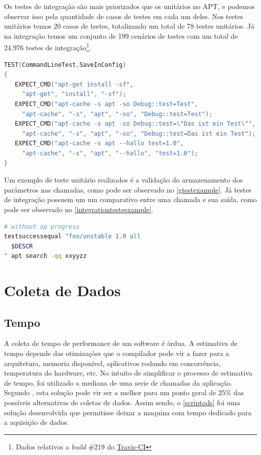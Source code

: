 Os testes de integração são mais priorizados que os unitários no APT, e podemos observar isso pela quantidade de casos de testes em cada um deles. Nos testes unitários temos 20 casos de testes, totalizando um total de 78 testes unitários. Já na integração temos um conjunto de 199 cenários de testes com um total de 24.976 testes de integração\footnote{Dados relativos a \textit{build} \#219 do \href{https://travis-ci.org/Debian/apt/builds/}{Travis-CI}}.


\begin{lstlisting}[language=C++,label=gtestexample,caption={Teste de validação de armazenamento de parâmetros}]
TEST(CommandLineTest,SaveInConfig)
{
   EXPECT_CMD("apt-get install -sf",
	 "apt-get", "install", "-sf");
   EXPECT_CMD("apt-cache -s apt -so Debug::test=Test",
	 "apt-cache", "-s", "apt", "-so", "Debug::test=Test");
   EXPECT_CMD("apt-cache -s apt -so Debug::test=\"Das ist ein Test\"",
	 "apt-cache", "-s", "apt", "-so", "Debug::test=Das ist ein Test");
   EXPECT_CMD("apt-cache -s apt --hallo test=1.0",
	 "apt-cache", "-s", "apt", "--hallo", "test=1.0");
}
\end{lstlisting}

Um exemplo de teste unitário realizados é a validação do armazenamento dos parâmetros nas chamadas, como pode ser observado no \autoref{gtestexample}. Já testes de integração possuem um um comparativo entre uma chamada e sua saída, como pode ser observado no \autoref{integrationtesteexample}.

\begin{lstlisting}[language=Bash,label=integrationtesteexample,caption={Teste de verificação de saída para busca}]
# without op progress
testsuccessequal "foo/unstable 1.0 all
  $DESCR
" apt search -qq xxyyzz
\end{lstlisting}



\section{Coleta de Dados} %
\label{cha:coleta_de_dados}

\subsection*{Tempo} %
\label{sec:tempo}

A coleta de tempo de performance de um software é árdua. A estimativa de tempo depende das otimizações que o compilador pode vir a fazer para a arquitetura, memoria disponível, aplicativos rodando em concorrência, temperatura do hardware, etc. No intuito de simplificar o processo de estimativa de tempo, foi utilizado a mediana de uma serie de chamadas da aplicação. Segundo , esta solução pode vir ser a melhor para um ponto geral de $25\%$ das possíveis alternativas de coletas de dados. Assim sendo, o \autoref{scriptods} foi uma solução desenvolvida que permitisse deixar a maquina com tempo dedicado para a aquisição de dados.

